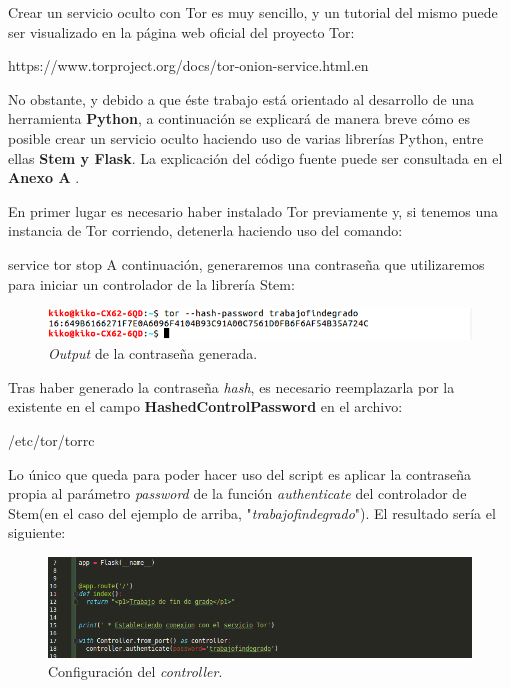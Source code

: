 Crear un servicio oculto con Tor es muy sencillo, y un tutorial del mismo puede ser visualizado en la página web oficial del proyecto Tor:

	{\selectfont 
		https://www.torproject.org/docs/tor-onion-service.html.en
	}

No obstante, y debido a que éste trabajo está orientado al desarrollo de una herramienta \textbf{Python}, a continuación se explicará de manera breve cómo es posible crear un servicio oculto haciendo uso de varias librerías Python, entre ellas \textbf{Stem y Flask}.
La explicación del código fuente puede ser consultada en el \textbf{Anexo A }.

En primer lugar es necesario haber instalado Tor previamente y, si tenemos una instancia de Tor corriendo, detenerla haciendo uso del comando:

	{\selectfont 
		service tor stop
	}
A continuación, generaremos una contraseña que utilizaremos para iniciar un controlador de la librería Stem:

	\begin{figure}[h]
		\centerline{
			\mbox{\includegraphics[width=5.00in]{images/hashed_pwd.png}}
		}
		\caption{\textit{Output} de la contraseña generada.}
		\label{fig:norm_Daugman}
	\end{figure}
	
Tras haber generado la contraseña \textit{hash}, es necesario reemplazarla por la existente en el campo \textbf{HashedControlPassword} en el archivo:

	{\selectfont 
		/etc/tor/torrc
	}

Lo único que queda para poder hacer uso del script es aplicar la contraseña propia al parámetro \textit{password} de la función \textit{authenticate} del controlador de Stem(en el caso del ejemplo de arriba, "\textit{trabajofindegrado}"). El resultado sería el siguiente:
\newpage
	\begin{figure}[h]
		\centerline{
			\mbox{\includegraphics[width=5.00in]{images/controller_auth.png}}
		}
		\caption{Configuración del \textit{controller}.}
		\label{fig:norm_Daugman}
	\end{figure}

